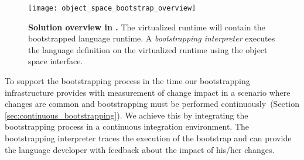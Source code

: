 %

\begin{figure}[ht]
\center
\texttt{[image: object\_space\_bootstrap\_overview]}
\caption{\textbf{Solution overview in \Vtt.} The virtualized runtime will contain the bootstrapped language runtime. A \emph{bootstrapping interpreter} executes the language definition on the virtualized runtime using the object space interface.\label{fig:objectSpaceOverview}}
\end{figure}

To support the bootstrapping process in the time our bootstrapping infrastructure provides with measurement of change impact in a scenario where changes are common and bootstrapping must be performed continuously~(Section \ref{sec:continuous_bootstrapping}). We achieve this by integrating the bootstrapping process in a continuous integration environment. The bootstrapping interpreter traces the execution of the bootstrap and can provide the language developer with feedback about the impact of his/her changes.

%


